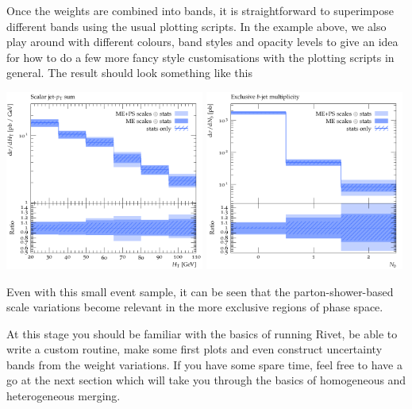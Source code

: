 \documentclass[10pt,fleqn]{scrartcl}
\theoremstyle{exstyle}
\begin{document}
Once the weights are combined into bands, it is straightforward
to superimpose different bands using the usual plotting
scripts. In the example above, we also play around with different
colours, band styles and opacity levels to give an idea
for how to do a few more fancy style customisations 
with the plotting scripts in general. 
The result should look something like this

\begin{center}
\includegraphics[width=0.49\textwidth]{figures/HT_bands.pdf}
\includegraphics[width=0.49\textwidth]{figures/bjets_excl_bands.pdf}
\end{center}

Even with this small event sample, it can be seen that the parton-shower-based
scale variations become relevant in the more exclusive regions of phase space.

At this stage you should be familiar with the basics of running Rivet,
be able to write a custom routine, make some first plots 
and even construct uncertainty bands from the weight variations.
If you have some spare time, feel free to have a go at the next section
which will take you through the basics of homogeneous and heterogeneous merging.
\end{document}
